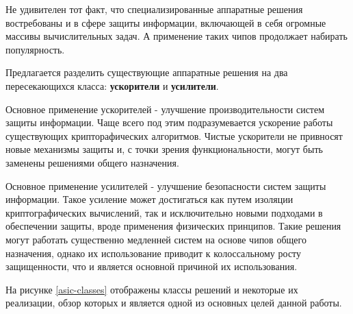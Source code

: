 \documentclass[a4paper,12pt]{article}
\begin{document}
Не удивителен тот факт, что специализированные аппаратные решения востребованы и в сфере защиты информации, включающей в себя огромные массивы вычислительных задач. А применение таких чипов продолжает набирать популярность. 

Предлагается разделить существующие аппаратные решения на два пересекающихся класса: \textbf{ускорители} и \textbf{усилители}.

Основное применение ускорителей - улучшение производительности систем защиты информации. Чаще всего под этим подразумевается ускорение работы существующих крипторафических алгоритмов. Чистые ускорители не привносят новые механизмы защиты и, с точки зрения функциональности, могут быть заменены решениями общего назначения.

Основное применение усилителей - улучшение безопасности систем защиты информации. Такое усиление может достигаться как путем изоляции криптографических вычислений, так и исключительно новыми подходами в обеспечении защиты, вроде применения физических принципов. Такие решения могут работать существенно медленней систем на основе чипов общего назначения, однако их использование приводит к колоссальному росту защищенности, что и является основной причиной их использования.

На рисунке \ref{asic-classes} отображены классы решений и некоторые их реализации, обзор которых и является одной из основных целей данной работы.  
\end{document}
